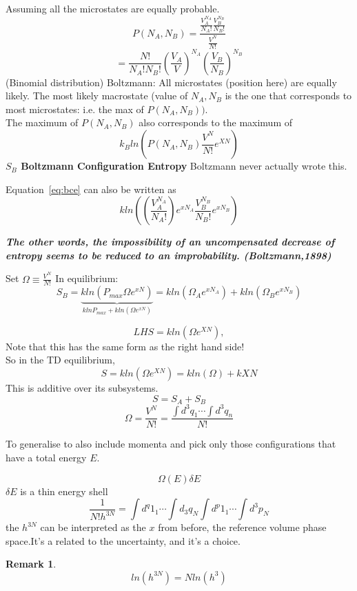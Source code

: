 \documentclass[11pt]{book}
\theoremstyle{definition}
\newtheorem{remark}{Remark}[section]
\begin{document}
Assuming all the microstates are equally probable.
\[ P(N_A, N_B) = \frac{ \frac{V_A^{N_A}}{N_A!} \frac{V_B^{N_B}}{N_B!} } {\frac{V^{N}}{N!}}\] 
\[ = \frac{N!}{N_A!N_B!} \left( \frac{V_A}{V} \right) ^{N_A} \left( \frac{V_B}{N_B} \right)^{N_B}  \] 
(Binomial distribution)
Boltzmann: All microstates (position here) are equally likely. The most likely macrostate (value of $ N_A, N_B $ is the one that corresponds to most microstates: i.e. the max of $P(N_A, N_B))$. \\
The maximum of $ P(N_A,N_B) $ also corresponds to the maximum of
\begin{equation}
	\label{eq:bce}
	 k_Bln\left( P(N_A,N_B) \frac{V^N}{N!} e^{XN} \right)  
 \end{equation}
\textbf{ $ S_B $ Boltzmann Configuration Entropy } 
Boltzmann never actually wrote this.

Equation~\ref{eq:bce} can also be written as
\[ kln((\frac{V_A^{N_A}}{N_A!}) e^{xN_A} \frac{V_B^{N_B}}{N_B!} e^{xN_B}) \] 

\textbf{\textit{The other words, the impossibility of an uncompensated decrease of entropy seems to be reduced to an improbability. (Boltzmann,1898)}}

Set $ \Omega \equiv \frac{V^{N}}{N!} $ 
In equilibrium:
\[ S_B = \underbrace{kln(P_{max} \Omega e^{xN})}_{klnP_{max}+kln(\Omega e^{xN})} = kln( \Omega_A  e^{xN_A}) + kln(\Omega_B e^{xN_B})\] 

\[ LHS = kln(\Omega e^{XN}), \]
Note that this has the same form as the right hand side! \\
So in the TD equilibrium,
\begin{equation}
	S = kln(\Omega e^{XN}) = kln(\Omega) + kXN
\end{equation}
This is additive  over its subsystems.
\[ S = S_A + S_B \] 
\begin{equation}
	\Omega = \frac{V^{N}}{N!} = \frac{ \int d^3 q_1 \cdots \int d^3 q_n }{N!}
\end{equation}

To generalise to also include momenta and pick only those configurations that have a total energy $ E $.

\[ \Omega(E) \delta E \] $ \delta E $ is a thin energy shell
\[ \frac{1}{N! h^{3N}}= \int d^q 1_1 \cdots \int d_3 q_N \int d^p 1_1 \cdots  \int d^3 p_N\] 
the $ h^{3N} $ can be interpreted as the $ x $ from before, the reference volume phase space.It's a related to the uncertainty, and it's a choice.

\begin{remark}
	\[ ln(h^{3N}) = Nln(h^{3}) \] 
\end{remark}
\end{document}
